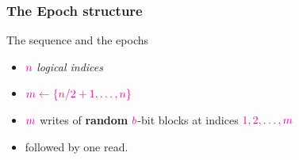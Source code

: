\documentclass[]{beamer}
\begin{document}
\begin{frame}
\frametitle{The Epoch structure}

\begin{block}{The sequence and the epochs}
\begin{itemize}
\item $\color{magenta} n$ {\em logical indices}
\item $\color{magenta} m\leftarrow\{n/2+1,\ldots, n\}$
\item $\color{magenta} m$ writes of {\bf random} $\color{magenta} b$-bit blocks at indices
$\color{magenta}1,2,\ldots,m$
\item followed by {\color{magenta} one} read.
\end{itemize}
\end{block}


\vfill


\end{frame}
\end{document}
